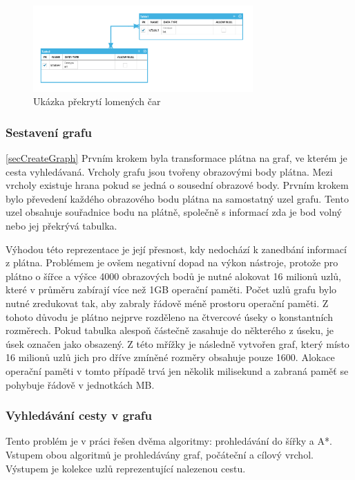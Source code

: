 \documentclass[czech,bachelor,public,dept460,male,oneside]{diploma}
\begin{document}
	\begin{figure}[!h]
		\centering
		\includegraphics[width=0.75\textwidth]{Figures/ScreenLineOverSelf}
		\caption{Ukázka překrytí lomených čar}
		\label{fig:screenLinesOverlay}
	\end{figure}
	
	\subsubsection{Sestavení grafu} \ref{secCreateGraph}
	Prvním krokem byla transformace plátna na graf, ve kterém je cesta vyhledávaná. Vrcholy grafu jsou tvořeny obrazovými body plátna. Mezi vrcholy existuje hrana  pokud se jedná o sousední obrazové body. Prvním krokem bylo převedení každého obrazového bodu plátna na samostatný uzel grafu. Tento uzel obsahuje souřadnice bodu na plátně, společně s informací zda je bod volný nebo jej překrývá tabulka.
	
	Výhodou této reprezentace je její přesnost, kdy nedochází k zanedbání informací z plátna. Problémem je ovšem negativní dopad na výkon nástroje, protože pro plátno o šířce a výšce 4000 obrazových bodů je nutné alokovat 16 milionů uzlů, které v průměru zabírají více než 1GB operační paměti. Počet uzlů grafu bylo nutné zredukovat tak, aby zabraly řádově méně prostoru operační paměti. Z tohoto důvodu je plátno nejprve rozděleno na čtvercové úseky o konstantních rozměrech. Pokud tabulka alespoň částečně zasahuje do některého z úseku, je úsek označen jako obsazený. Z této mřížky je následně vytvořen graf, který místo 16 milionů uzlů jich pro dříve zmíněné rozměry obsahuje pouze 1600. Alokace operační paměti v tomto případě trvá jen několik milisekund a zabraná paměť se pohybuje řádově v jednotkách MB.
	
	\subsubsection{Vyhledávání cesty v grafu}
	Tento problém je v práci řešen dvěma algoritmy: prohledávání do šířky a A*. Vstupem obou algoritmů je prohledávány graf, počáteční a cílový vrchol. Výstupem je kolekce uzlů reprezentující nalezenou cestu.
	
\end{document}
